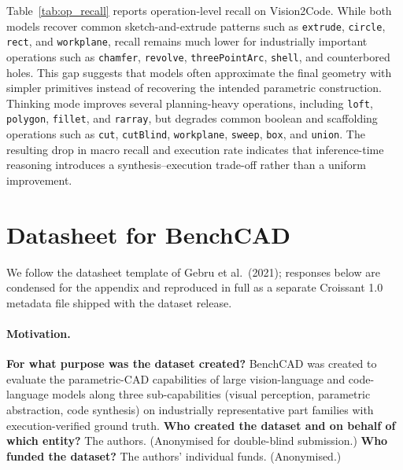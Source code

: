 Table~\ref{tab:op_recall} reports operation-level recall on Vision2Code.
While both models recover common sketch-and-extrude patterns such as \texttt{extrude}, \texttt{circle}, \texttt{rect}, and \texttt{workplane}, recall remains much lower for industrially important operations such as \texttt{chamfer}, \texttt{revolve}, \texttt{threePointArc}, \texttt{shell}, and counterbored holes.
This gap suggests that models often approximate the final geometry with simpler primitives instead of recovering the intended parametric construction.
Thinking mode improves several planning-heavy operations, including \texttt{loft}, \texttt{polygon}, \texttt{fillet}, and \texttt{rarray}, but degrades common boolean and scaffolding operations such as \texttt{cut}, \texttt{cutBlind}, \texttt{workplane}, \texttt{sweep}, \texttt{box}, and \texttt{union}.
The resulting drop in macro recall and execution rate indicates that inference-time reasoning introduces a synthesis--execution trade-off rather than a uniform improvement.



\section{Datasheet for BenchCAD}
\label{app:datasheet}

We follow the datasheet template of Gebru et al.\ (2021); responses below are condensed for the appendix and reproduced in full as a separate Croissant 1.0 metadata file shipped with the dataset release.

\paragraph{Motivation.}
\textbf{For what purpose was the dataset created?} BenchCAD was created to evaluate the parametric-CAD capabilities of large vision-language and code-language models along three sub-capabilities (visual perception, parametric abstraction, code synthesis) on industrially representative part families with execution-verified ground truth.
\textbf{Who created the dataset and on behalf of which entity?} The authors. (Anonymised for double-blind submission.)
\textbf{Who funded the dataset?} The authors' individual funds. (Anonymised.)

